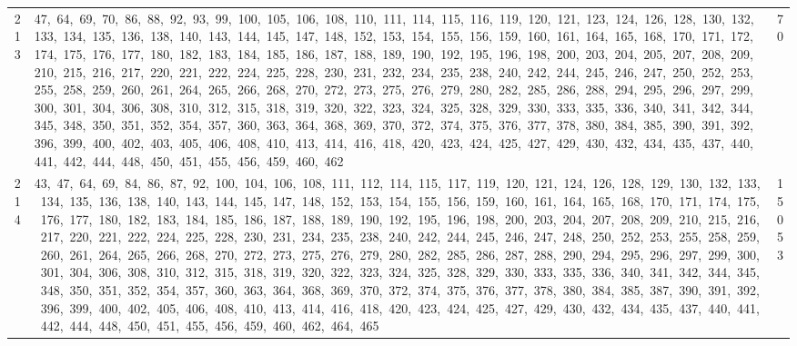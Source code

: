 \begin{longtable}{c|p{}|r}
213 & 47,\ 64,\ 69,\ 70,\ 86,\ 88,\ 92,\ 93,\ 99,\ 100,\ 105,\ 106,\ 108,\ 110,\ 111,\ 114,\ 115,\ 116,\ 119,\ 120,\ 121,\ 123,\ 124,\ 126,\ 128,\ 130,\ 132,\ 133,\ 134,\ 135,\ 136,\ 138,\ 140,\ 143,\ 144,\ 145,\ 147,\ 148,\ 152,\ 153,\ 154,\ 155,\ 156,\ 159,\ 160,\ 161,\ 164,\ 165,\ 168,\ 170,\ 171,\ 172,\ 174,\ 175,\ 176,\ 177,\ 180,\ 182,\ 183,\ 184,\ 185,\ 186,\ 187,\ 188,\ 189,\ 190,\ 192,\ 195,\ 196,\ 198,\ 200,\ 203,\ 204,\ 205,\ 207,\ 208,\ 209,\ 210,\ 215,\ 216,\ 217,\ 220,\ 221,\ 222,\ 224,\ 225,\ 228,\ 230,\ 231,\ 232,\ 234,\ 235,\ 238,\ 240,\ 242,\ 244,\ 245,\ 246,\ 247,\ 250,\ 252,\ 253,\ 255,\ 258,\ 259,\ 260,\ 261,\ 264,\ 265,\ 266,\ 268,\ 270,\ 272,\ 273,\ 275,\ 276,\ 279,\ 280,\ 282,\ 285,\ 286,\ 288,\ 294,\ 295,\ 296,\ 297,\ 299,\ 300,\ 301,\ 304,\ 306,\ 308,\ 310,\ 312,\ 315,\ 318,\ 319,\ 320,\ 322,\ 323,\ 324,\ 325,\ 328,\ 329,\ 330,\ 333,\ 335,\ 336,\ 340,\ 341,\ 342,\ 344,\ 345,\ 348,\ 350,\ 351,\ 352,\ 354,\ 357,\ 360,\ 363,\ 364,\ 368,\ 369,\ 370,\ 372,\ 374,\ 375,\ 376,\ 377,\ 378,\ 380,\ 384,\ 385,\ 390,\ 391,\ 392,\ 396,\ 399,\ 400,\ 402,\ 403,\ 405,\ 406,\ 408,\ 410,\ 413,\ 414,\ 416,\ 418,\ 420,\ 423,\ 424,\ 425,\ 427,\ 429,\ 430,\ 432,\ 434,\ 435,\ 437,\ 440,\ 441,\ 442,\ 444,\ 448,\ 450,\ 451,\ 455,\ 456,\ 459,\ 460,\ 462 & 70 \\
214 & 43,\ 47,\ 64,\ 69,\ 84,\ 86,\ 87,\ 92,\ 100,\ 104,\ 106,\ 108,\ 111,\ 112,\ 114,\ 115,\ 117,\ 119,\ 120,\ 121,\ 124,\ 126,\ 128,\ 129,\ 130,\ 132,\ 133,\ 134,\ 135,\ 136,\ 138,\ 140,\ 143,\ 144,\ 145,\ 147,\ 148,\ 152,\ 153,\ 154,\ 155,\ 156,\ 159,\ 160,\ 161,\ 164,\ 165,\ 168,\ 170,\ 171,\ 174,\ 175,\ 176,\ 177,\ 180,\ 182,\ 183,\ 184,\ 185,\ 186,\ 187,\ 188,\ 189,\ 190,\ 192,\ 195,\ 196,\ 198,\ 200,\ 203,\ 204,\ 207,\ 208,\ 209,\ 210,\ 215,\ 216,\ 217,\ 220,\ 221,\ 222,\ 224,\ 225,\ 228,\ 230,\ 231,\ 234,\ 235,\ 238,\ 240,\ 242,\ 244,\ 245,\ 246,\ 247,\ 248,\ 250,\ 252,\ 253,\ 255,\ 258,\ 259,\ 260,\ 261,\ 264,\ 265,\ 266,\ 268,\ 270,\ 272,\ 273,\ 275,\ 276,\ 279,\ 280,\ 282,\ 285,\ 286,\ 287,\ 288,\ 290,\ 294,\ 295,\ 296,\ 297,\ 299,\ 300,\ 301,\ 304,\ 306,\ 308,\ 310,\ 312,\ 315,\ 318,\ 319,\ 320,\ 322,\ 323,\ 324,\ 325,\ 328,\ 329,\ 330,\ 333,\ 335,\ 336,\ 340,\ 341,\ 342,\ 344,\ 345,\ 348,\ 350,\ 351,\ 352,\ 354,\ 357,\ 360,\ 363,\ 364,\ 368,\ 369,\ 370,\ 372,\ 374,\ 375,\ 376,\ 377,\ 378,\ 380,\ 384,\ 385,\ 387,\ 390,\ 391,\ 392,\ 396,\ 399,\ 400,\ 402,\ 405,\ 406,\ 408,\ 410,\ 413,\ 414,\ 416,\ 418,\ 420,\ 423,\ 424,\ 425,\ 427,\ 429,\ 430,\ 432,\ 434,\ 435,\ 437,\ 440,\ 441,\ 442,\ 444,\ 448,\ 450,\ 451,\ 455,\ 456,\ 459,\ 460,\ 462,\ 464,\ 465 & 15053 \\

\end{longtable}
